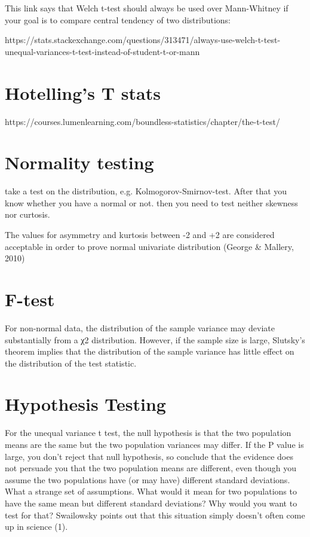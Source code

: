 \documentclass[11pt]{article}
\begin{document}
This link says that Welch t-test should always be used over Mann-Whitney
if your goal is to compare central tendency of two distributions:

https://stats.stackexchange.com/questions/313471/always-use-welch-t-test-unequal-variances-t-test-instead-of-student-t-or-mann

\section{Hotelling's T stats}\label{hotellings-t-stats}

https://courses.lumenlearning.com/boundless-statistics/chapter/the-t-test/

    \section{Normality testing}\label{normality-testing}

take a test on the distribution, e.g. Kolmogorov-Smirnov-test. After
that you know whether you have a normal or not. then you need to test
neither skewness nor curtosis.

The values for asymmetry and kurtosis between -2 and +2 are considered
acceptable in order to prove normal univariate distribution (George \&
Mallery, 2010)

    \section{F-test}\label{f-test}

For non-normal data, the distribution of the sample variance may deviate
substantially from a χ2 distribution. However, if the sample size is
large, Slutsky's theorem implies that the distribution of the sample
variance has little effect on the distribution of the test statistic.

    \section{Hypothesis Testing}\label{hypothesis-testing}

For the unequal variance t test, the null hypothesis is that the two
population means are the same but the two population variances may
differ. If the P value is large, you don't reject that null hypothesis,
so conclude that the evidence does not persuade you that the two
population means are different, even though you assume the two
populations have (or may have) different standard deviations. What a
strange set of assumptions. What would it mean for two populations to
have the same mean but different standard deviations? Why would you want
to test for that? Swailowsky points out that this situation simply
doesn't often come up in science (1).
\end{document}
